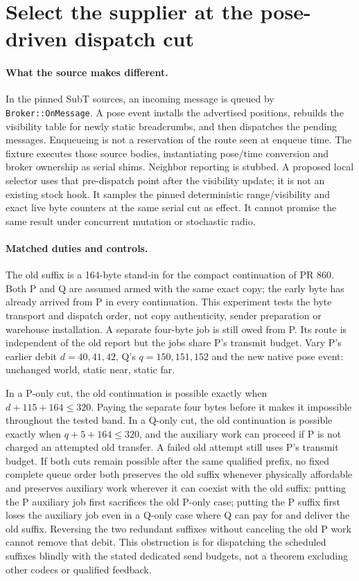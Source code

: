 \documentclass{article}
\begin{document}
\section*{Select the supplier at the pose-driven dispatch cut}
\paragraph{What the source makes different.}
In the pinned SubT sources, an incoming message is queued by
\texttt{Broker::OnMessage}. A pose event installs the advertised
positions, rebuilds the visibility table for newly static
breadcrumbs, and then dispatches the pending messages. Enqueueing
is not a reservation of the route seen at enqueue time. The fixture
executes those source bodies, instantiating pose/time conversion and
broker ownership as serial shims. Neighbor reporting is stubbed.
A proposed local selector uses that pre-dispatch point after the
visibility update; it is not an existing stock hook. It samples
the pinned deterministic range/visibility and exact live byte
counters at the same serial cut as effect. It cannot promise the
same result under concurrent mutation or stochastic radio.

\paragraph{Matched duties and controls.}
The old suffix is a 164-byte stand-in for the compact continuation
of PR 860. Both P and Q are assumed armed with the same exact copy;
the early byte has already arrived from P in every continuation.
This experiment tests the byte transport and dispatch order, not
copy authenticity, sender preparation or warehouse installation.
A separate four-byte job is still owed from P. Its route is
independent of the old report but the jobs share P's transmit budget.
Vary P's earlier debit $d=40,41,42$, Q's $q=150,151,152$ and the
new native pose event: unchanged world, static near, static far.

In a P-only cut, the old continuation is possible exactly when
$d+115+164\le320$. Paying the separate four bytes before it makes
it impossible throughout the tested band. In a Q-only cut, the old
continuation is possible exactly when $q+5+164\le320$, and the
auxiliary work can proceed if P is not charged an attempted old
transfer. A failed old attempt still uses P's transmit budget.
If both cuts remain possible after the same qualified prefix,
no fixed complete queue order both preserves the old suffix
whenever physically affordable and preserves auxiliary work wherever
it can coexist with the old suffix:
putting the P auxiliary job first sacrifices the old P-only case;
putting the P suffix first loses the auxiliary job even in a
Q-only case where Q can pay for and deliver the old suffix.
Reversing the two redundant suffixes without canceling the old
P work cannot remove that debit. This obstruction is for dispatching
the scheduled suffixes blindly with the stated dedicated send budgets,
not a theorem excluding other codecs or qualified feedback.
\end{document}
